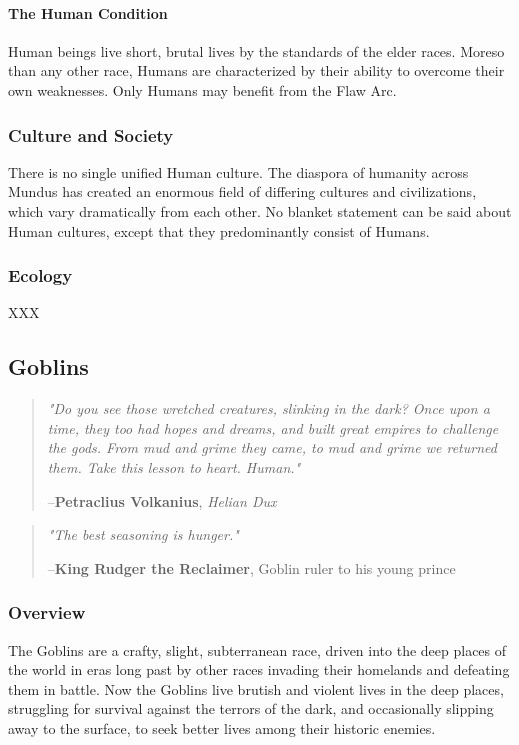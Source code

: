 \documentclass[oneside,11pt,english]{book}
\begin{document}
\paragraph{The Human Condition}
Human beings live short, brutal lives by the standards of the elder races. Moreso than any other 
race, Humans are characterized by their ability to overcome their own weaknesses. Only Humans 
may benefit from the Flaw Arc. 
\subsubsection*{Culture and Society} 
There is no single unified Human culture. The diaspora of humanity across Mundus has created an 
enormous field of differing cultures and civilizations, which vary dramatically from each other. No 
blanket statement can be said about Human cultures, except that they predominantly consist of Humans.
\subsubsection*{Ecology} 
XXX 
\subsection{Goblins}
\begin{quotation}
	\emph{"Do you see those wretched creatures, slinking in the dark? Once upon a time, they too had hopes and dreams, and built great 
empires to challenge the gods. From mud and grime they came, to mud and grime we returned them. Take this lesson to heart. 
Human."}

	\hfill--\textbf{Petraclius Volkanius}, \textit{Helian Dux}
\end{quotation}
\begin{quotation} 
	\emph{"The best seasoning is hunger."}

	\hfill--\textbf{King Rudger the Reclaimer}, Goblin ruler to his young prince 
\end{quotation}
\subsubsection*{Overview} 
The Goblins are a crafty, slight, subterranean race, driven into the deep places of the world in eras long 
past by other races invading their homelands and defeating them in battle. Now the Goblins live brutish 
and violent lives in the deep places, struggling for survival against the terrors of the dark, and 
occasionally slipping away to the surface, to seek better lives among their historic enemies. 
\end{document}
